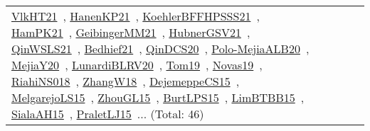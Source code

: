 {\begin{longtable}{lp{3cm}>{\raggedright\arraybackslash}p{6cm}>{\raggedright\arraybackslash}p{6cm}>{\raggedright\arraybackslash}p{8cm}}
\href{works/VlkHT21.pdf}{VlkHT21}~\cite{VlkHT21}, \href{works/HanenKP21.pdf}{HanenKP21}~\cite{HanenKP21}, \href{works/KoehlerBFFHPSSS21.pdf}{KoehlerBFFHPSSS21}~\cite{KoehlerBFFHPSSS21}, \href{works/HamPK21.pdf}{HamPK21}~\cite{HamPK21}, \href{works/GeibingerMM21.pdf}{GeibingerMM21}~\cite{GeibingerMM21}, \href{works/HubnerGSV21.pdf}{HubnerGSV21}~\cite{HubnerGSV21}, \href{works/QinWSLS21.pdf}{QinWSLS21}~\cite{QinWSLS21}, \href{works/Bedhief21.pdf}{Bedhief21}~\cite{Bedhief21}, \href{works/QinDCS20.pdf}{QinDCS20}~\cite{QinDCS20}, \href{works/Polo-MejiaALB20.pdf}{Polo-MejiaALB20}~\cite{Polo-MejiaALB20}, \href{works/MejiaY20.pdf}{MejiaY20}~\cite{MejiaY20}, \href{works/LunardiBLRV20.pdf}{LunardiBLRV20}~\cite{LunardiBLRV20}, \href{works/Tom19.pdf}{Tom19}~\cite{Tom19}, \href{works/Novas19.pdf}{Novas19}~\cite{Novas19}, \href{works/RiahiNS018.pdf}{RiahiNS018}~\cite{RiahiNS018}, \href{works/ZhangW18.pdf}{ZhangW18}~\cite{ZhangW18}, \href{works/DejemeppeCS15.pdf}{DejemeppeCS15}~\cite{DejemeppeCS15}, \href{works/MelgarejoLS15.pdf}{MelgarejoLS15}~\cite{MelgarejoLS15}, \href{works/ZhouGL15.pdf}{ZhouGL15}~\cite{ZhouGL15}, \href{works/BurtLPS15.pdf}{BurtLPS15}~\cite{BurtLPS15}, \href{works/LimBTBB15.pdf}{LimBTBB15}~\cite{LimBTBB15}, \href{works/SialaAH15.pdf}{SialaAH15}~\cite{SialaAH15}, \href{works/PraletLJ15.pdf}{PraletLJ15}~\cite{PraletLJ15}... (Total: 46)\\

\end{longtable}}
